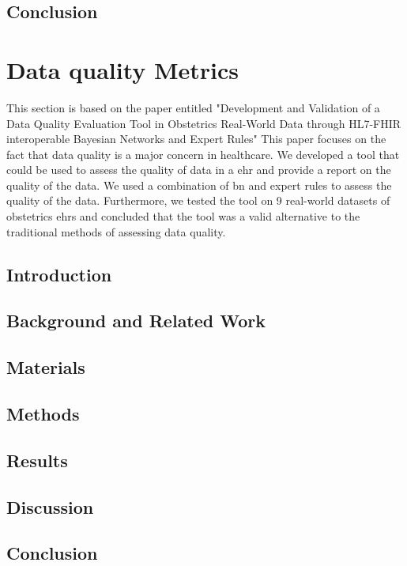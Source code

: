\subsection{Conclusion}



\section{Data quality Metrics}\label{subsec:dq}
This section is based on the paper entitled "Development and Validation of a Data Quality Evaluation Tool in Obstetrics Real-World Data through HL7-FHIR interoperable Bayesian Networks and Expert Rules" This paper focuses on the fact that data quality is a major concern in healthcare. We developed a tool that could be used to assess the quality of data in a \ac{ehr} and provide a report on the quality of the data. We used a combination of \ac{bn} and expert rules to assess the quality of the data. Furthermore, we tested the tool on 9 real-world datasets of obstetrics \acp{ehr} and concluded that the tool was a valid alternative to the traditional methods of assessing data quality.
%
\subsection{Introduction}

\subsection{Background and Related Work}

\subsection{Materials}

\subsection{Methods}

\subsection{Results}

\subsection{Discussion}

\subsection{Conclusion}



